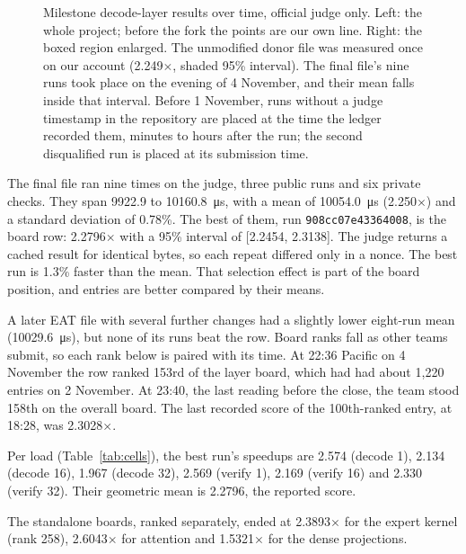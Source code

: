 \documentclass[11pt]{article}
\begin{document}
\begin{figure}[t]
\caption{Milestone decode-layer results over time, official judge only. Left: the
whole project; before the fork the points are our own line. Right: the boxed
region enlarged. The unmodified donor file was measured once on our account
(2.249$\times$, shaded 95\% interval). The final file's nine runs took place on the
evening of 4 November, and their mean falls inside that interval. Before
1 November, runs without a judge timestamp in the repository are placed at the
time the ledger recorded them, minutes to hours after the run; the second
disqualified run is placed at its submission time.}
\label{fig:timeline}
\end{figure}

The final file ran nine times on the judge, three public runs and six private
checks. They span \num{9922.9} to \SI{10160.8}{\micro\second}, with a mean of
\SI{10054.0}{\micro\second} (2.250$\times$) and a standard deviation of 0.78\%. The
best of them, run \texttt{908cc07e43364008}, is the board row: 2.2796$\times$ with a
95\% interval of [2.2454, 2.3138]. The judge returns a cached result for identical
bytes, so each repeat differed only in a nonce. The best run is 1.3\% faster than
the mean. That selection effect is part of the board position, and entries are
better compared by their means.

A later EAT file with several further changes had a slightly lower eight-run
mean (\SI{10029.6}{\micro\second}), but none of its runs beat the row. Board ranks
fall as other teams submit, so each rank below is paired with its time. At 22:36
Pacific on 4 November the row ranked 153rd of the layer board, which had had about
1{,}220 entries on 2 November. At 23:40, the last reading before the close, the
team stood 158th on the overall board. The last recorded score of the
100th-ranked entry, at 18:28, was 2.3028$\times$.

Per load (Table~\ref{tab:cells}), the best run's speedups are 2.574 (decode 1),
2.134 (decode 16), 1.967 (decode 32), 2.569 (verify 1), 2.169 (verify 16) and
2.330 (verify 32). Their geometric mean is 2.2796, the reported score.

The standalone boards, ranked separately, ended at 2.3893$\times$ for the
expert kernel (rank 258), 2.6043$\times$ for attention and 1.5321$\times$ for the
dense projections.
\end{document}

